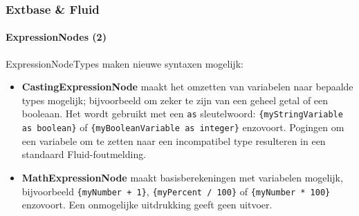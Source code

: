 
\begin{frame}[fragile]
	\frametitle{Extbase \& Fluid}
	\framesubtitle{ExpressionNodes (2)}

	ExpressionNodeTypes maken nieuwe syntaxen mogelijk:

	\begin{itemize}

		\item \textbf{CastingExpressionNode}\newline
			\small
				maakt het omzetten van variabelen naar bepaalde types mogelijk; bijvoorbeeld
				om zeker te zijn van een geheel getal of een booleaan. Het wordt gebruikt met een
				\texttt{as} sleutelwoord:
				\texttt{\{myStringVariable as boolean\}} of
				\texttt{\{myBooleanVariable as integer\}} enzovoort.
				Pogingen om een variabele om te zetten naar een incompatibel type resulteren in een
				standaard Fluid-foutmelding.
			\normalsize

		\item \textbf{MathExpressionNode}\newline
			\small
				maakt basisberekeningen met variabelen mogelijk, bijvoorbeeld
				\texttt{\{myNumber + 1\}}, \texttt{\{myPercent / 100\}} of
				\texttt{\{myNumber * 100\}} enzovoort.
				Een onmogelijke uitdrukking geeft geen uitvoer.
			\normalsize

	\end{itemize}

\end{frame}


